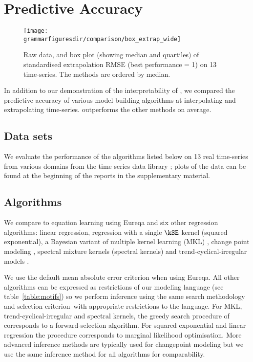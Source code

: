 \section{Predictive Accuracy}
\label{sec:numerical}

\begin{figure*}[ht]
\centering
\texttt{[image: \\grammarfiguresdir/comparison/box\_extrap\_wide]}
\vspace{-0.8cm}
\caption[Comparision of extrapolation error of all methods on 13 time-series datasets.]
{Raw data, and box plot (showing median and quartiles) of standardised extrapolation RMSE (best performance = 1) on 13 time-series.
The methods are ordered by median.
}
\label{fig:box_extrap_dist}
\end{figure*}

In addition to our demonstration of the interpretability of \procedurename{}, we compared the predictive accuracy of various model-building algorithms at interpolating and extrapolating time-series.
\procedurename{} outperforms the other methods on average.

\subsection{Data sets}

We evaluate the performance of the algorithms listed below on 13 real time-series from various domains from the time series data library \citep{TSDL}; plots of the data can be found at the beginning of the reports in the supplementary material.

\subsection{Algorithms}

We compare \procedurename{} to equation learning using Eureqa \citep{Eureqa} and six other regression algorithms: linear regression, \gp{} regression with a single $\kSE$ kernel (squared exponential), a Bayesian variant of multiple kernel learning (MKL) \citep[e.g.][]{bach2004multiple}, change point modeling \citep[e.g.][]{garnett2010sequential, saatcci2010gaussian, FoxDunson:NIPS2012}, spectral mixture kernels \citep{WilAda13} (spectral kernels) and trend-cyclical-irregular models \citep[e.g.][]{lind2006basic}.

We use the default mean absolute error criterion when using Eureqa.
All other algorithms can be expressed as restrictions of our modeling language (see table~\ref{table:motifs}) so we perform inference using the same search methodology and selection criterion\footnotemark~with appropriate restrictions to the language.
For MKL, trend-cyclical-irregular and spectral kernels, the greedy search procedure of \procedurename{} corresponds to a forward-selection algorithm.
For squared exponential and linear regression the procedure corresponds to marginal likelihood optimisation.
More advanced inference methods are typically used for changepoint modeling but we use the same inference method for all algorithms for comparability.

